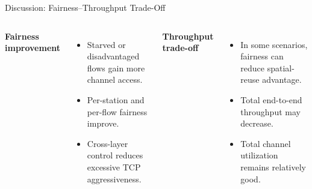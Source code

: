 \begin{frame}{Discussion: Fairness--Throughput Trade-Off}

\begin{columns}[T,onlytextwidth]
\textbf{Fairness improvement}
\begin{itemize}
    \item Starved or disadvantaged flows gain more channel access.
    \item Per-station and per-flow fairness improve.
    \item Cross-layer control reduces excessive TCP aggressiveness.
\end{itemize}

\textbf{Throughput trade-off}
\begin{itemize}
    \item In some scenarios, fairness can reduce spatial-reuse advantage.
    \item Total end-to-end throughput may decrease.
    \item Total channel utilization remains relatively good.
\end{itemize}
\end{columns}

\vspace{0.35cm}
\end{frame}
